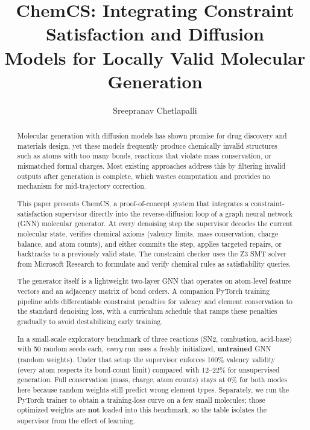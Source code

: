 \documentclass[11pt]{article}
\title{ChemCS: Integrating Constraint Satisfaction and Diffusion\\Models for Locally Valid Molecular Generation}
\author{Sreepranav Chetlapalli}
\date{}
\begin{document}
\maketitle

\begin{abstract}
Molecular generation with diffusion models has shown promise for drug
discovery and materials design, yet these models frequently produce
chemically invalid structures such as atoms with too many bonds,
reactions that violate mass conservation, or mismatched formal charges.
Most existing approaches address this by filtering invalid outputs
after generation is complete, which wastes computation and provides no
mechanism for mid-trajectory correction.

This paper presents ChemCS, a proof-of-concept system that integrates a
constraint-satisfaction supervisor directly into the reverse-diffusion
loop of a graph neural network (GNN) molecular generator. At every
denoising step the supervisor decodes the current molecular state,
verifies chemical axioms (valency limits, mass conservation, charge
balance, and atom counts), and either commits the step, applies targeted
repairs, or backtracks to a previously valid state. The constraint
checker uses the Z3 SMT solver from Microsoft Research to formulate and
verify chemical rules as satisfiability queries.

The generator itself is a lightweight two-layer GNN that operates on
atom-level feature vectors and an adjacency matrix of bond orders. A
companion PyTorch training pipeline adds differentiable constraint
penalties for valency and element conservation to the standard denoising
loss, with a curriculum schedule that ramps these penalties gradually to
avoid destabilizing early training.

In a small-scale exploratory benchmark of three reactions (SN2,
combustion, acid-base) with 50 random seeds each, \emph{every} run uses a
freshly initialized, \textbf{untrained} GNN (random weights). Under that
setup the supervisor enforces 100\% valency validity (every atom respects
its bond-count limit) compared with 12--22\% for unsupervised generation.
Full conservation (mass, charge, atom counts) stays at 0\% for both
modes here because random weights still predict wrong element types.
Separately, we run the PyTorch trainer to obtain a training-loss curve
on a few small molecules; those optimized weights are \textbf{not} loaded
into this benchmark, so the table isolates the supervisor from the effect
of learning.
\end{abstract}
\end{document}
